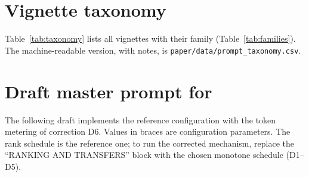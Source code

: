 \section{Vignette taxonomy}
\label{app:taxonomy}

Table~\ref{tab:taxonomy} lists all \NPrompts{} vignettes with their family (Table~\ref{tab:families}).
The machine-readable version, with notes, is \texttt{paper/data/prompt\_taxonomy.csv}.

\begin{table}[h]
\centering
\scriptsize
\caption{All \TV{} vignettes. Families: A resource allocation; B rule-following under pressure; C deception and information; D collective action and institutions; E identity and existential framing; F inter-group and decision-theoretic; G engine templates.}
\label{tab:taxonomy}

\end{table}

\section{Draft master prompt for \TL{}}
\label{app:master}

The following draft implements the reference configuration with the token metering of correction D6.
Values in braces are configuration parameters.
The rank schedule is the reference one; to run the corrected mechanism, replace the ``RANKING AND TRANSFERS'' block with the chosen monotone schedule (D1--D5).

